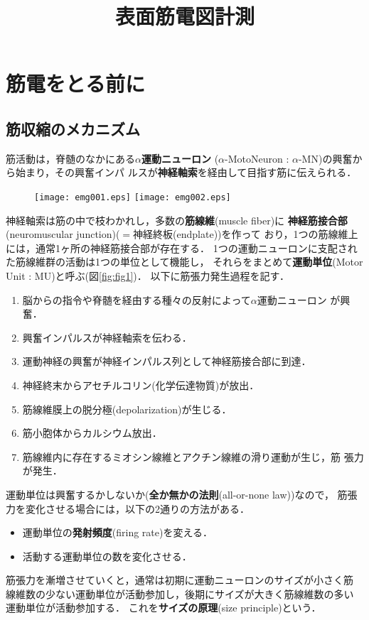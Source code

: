 \documentclass[10pt,twocolumn]{jarticle}
\title{表面筋電図計測}
\author{}
\date{}
\begin{document}
\maketitle
\section{筋電をとる前に}
\subsection{筋収縮のメカニズム}
筋活動は，脊髄のなかにある{\bf $\alpha$運動ニューロン}
  ($\alpha$-MotoNeuron : $\alpha$-MN)の興奮から始まり，その興奮インパ
ルスが{\bf 神経軸索}を経由して目指す筋に伝えられる．
\begin{figure}[b]
  \begin{center}
    \texttt{[image: emg001.eps]} 
    \label{fig:fig1}
    \texttt{[image: emg002.eps]} 
    \label{fig:fig2}
  \end{center}
\end{figure}
神経軸索は筋の中で枝わかれし，多数の{\bf 筋線維}(muscle fiber)に{\bf
  神経筋接合部}(neuromuscular junction)($=$神経終板(endplate))を作って
おり，1つの筋線維上には，通常1ヶ所の神経筋接合部が存在する．
1つの運動ニューロンに支配された筋線維群の活動は1つの単位として機能し，
それらをまとめて{\bf 運動単位}(Motor Unit : MU)と呼ぶ(図\ref{fig:fig1})．
以下に筋張力発生過程を記す．
\begin{enumerate}
\item 脳からの指令や脊髄を経由する種々の反射によって$\alpha$運動ニューロン
  が興奮．
\item 興奮インパルスが神経軸索を伝わる．
\item 運動神経の興奮が神経インパルス列として神経筋接合部に到達．
\item 神経終末からアセチルコリン(化学伝達物質)が放出．
\item 筋線維膜上の脱分極(depolarization)が生じる．
\item 筋小胞体からカルシウム放出．
\item 筋線維内に存在するミオシン線維とアクチン線維の滑り運動が生じ，筋
  張力が発生．
\end{enumerate}

運動単位は興奮するかしないか({\bf 全か無かの法則}(all-or-none law))なので，
筋張力を変化させる場合には，以下の2通りの方法がある．
\begin{itemize}
\item 運動単位の{\bf 発射頻度}(firing rate)を変える．
\item 活動する運動単位の数を変化させる．
\end{itemize}
筋張力を漸増させていくと，通常は初期に運動ニューロンのサイズが小さく筋
線維数の少ない運動単位が活動参加し，後期にサイズが大きく筋線維数の多い
運動単位が活動参加する．
これを{\bf サイズの原理}(size principle)という．
\end{document}
